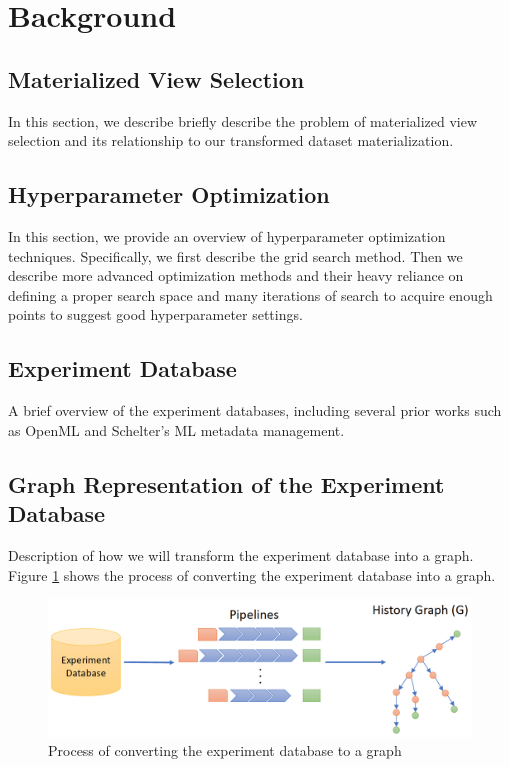 \section{Background} \label{sec-background}
\subsection{Materialized View Selection}
In this section, we describe briefly describe the problem of materialized view selection and its relationship to our transformed dataset materialization.
\subsection{Hyperparameter Optimization}
In this section, we provide an overview of hyperparameter optimization techniques. 
Specifically, we first describe the grid search method.
Then we describe more advanced optimization methods and their heavy reliance on defining a proper search space and many iterations of search to acquire enough points to suggest good hyperparameter settings.

\subsection{Experiment Database}
A brief overview of the experiment databases, including several prior works such as OpenML and Schelter's  ML metadata management.

\subsection{Graph Representation of the Experiment Database}
Description of how we will transform the experiment database into a graph.
Figure \ref{fig-graph-creation} shows the process of converting the experiment database into a graph.

\begin{figure}
\centering
\includegraphics[width=\columnwidth]{../images/graph-creation.png}
\caption{Process of converting the experiment database to a graph}
\label{fig-graph-creation}
\end{figure}
